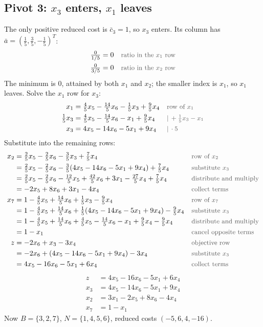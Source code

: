 \documentclass[a4paper,11pt]{article}
\newcommand{\teil}[1]{\subsection*{#1}}
\newcommand{\why}[1]{\text{\small\color{black!65}#1}}
\begin{document}
\teil{Pivot 3: $x_3$ enters, $x_1$ leaves}
The only positive reduced cost is $\bar c_3=1$, so $x_3$ enters. Its column has $\bar a = (\tfrac15,\tfrac35,-\tfrac15)^T$:
\begin{align*}
\tfrac{0}{1/5} &= 0 && \why{ratio in the $x_1$ row}\\
\tfrac{0}{3/5} &= 0 && \why{ratio in the $x_2$ row}
\end{align*}
The minimum is $0$, attained by both $x_1$ and $x_2$; the smaller index is $x_1$, so $x_1$ leaves. Solve the $x_1$ row for $x_3$:
\begin{align*}
x_1 &= \tfrac45 x_5 - \tfrac{14}{5} x_6 - \tfrac15 x_3 + \tfrac95 x_4 && \why{row of $x_1$}\\
\tfrac15 x_3 &= \tfrac45 x_5 - \tfrac{14}{5} x_6 - x_1 + \tfrac95 x_4 && \why{$|\,+\tfrac15 x_3 - x_1$}\\
x_3 &= 4x_5 - 14x_6 - 5x_1 + 9x_4 && \why{$|\,\cdot 5$}
\end{align*}
Substitute into the remaining rows:
\begin{align*}
x_2 &= \tfrac25 x_5 - \tfrac25 x_6 - \tfrac35 x_3 + \tfrac75 x_4 && \why{row of $x_2$}\\
&= \tfrac25 x_5 - \tfrac25 x_6 - \tfrac35(4x_5 - 14x_6 - 5x_1 + 9x_4) + \tfrac75 x_4 && \why{substitute $x_3$}\\
&= \tfrac25x_5-\tfrac25x_6-\tfrac{12}{5}x_5+\tfrac{42}{5}x_6+3x_1-\tfrac{27}{5}x_4+\tfrac75x_4 && \why{distribute and multiply}\\
&= -2x_5 + 8x_6 + 3x_1 - 4x_4 && \why{collect terms}\\
x_7 &= 1 - \tfrac45 x_5 + \tfrac{14}{5} x_6 + \tfrac15 x_3 - \tfrac95 x_4 && \why{row of $x_7$}\\
&=1-\tfrac45x_5+\tfrac{14}{5}x_6+\tfrac15(4x_5-14x_6-5x_1+9x_4)-\tfrac95x_4 && \why{substitute $x_3$}\\
&=1-\tfrac45x_5+\tfrac{14}{5}x_6+\tfrac45x_5-\tfrac{14}{5}x_6-x_1+\tfrac95x_4-\tfrac95x_4 && \why{distribute and multiply}\\
&=1-x_1 && \why{cancel opposite terms}\\
z &= -2x_6 + x_3 - 3x_4 && \why{objective row}\\
&= -2x_6 + (4x_5 - 14x_6 - 5x_1 + 9x_4) - 3x_4 && \why{substitute $x_3$}\\
&= 4x_5 - 16x_6 - 5x_1 + 6x_4 && \why{collect terms}
\end{align*}
\[
\begin{aligned}
z &= 4x_5 - 16x_6 - 5x_1 + 6x_4\\
x_3 &= 4x_5 - 14x_6 - 5x_1 + 9x_4\\
x_2 &= 3x_1 - 2x_5 + 8x_6 - 4x_4\\
x_7 &= 1 - x_1
\end{aligned}
\]
Now $B=\{3,2,7\}$, $N=\{1,4,5,6\}$, reduced costs $(-5,6,4,-16)$.
\end{document}
